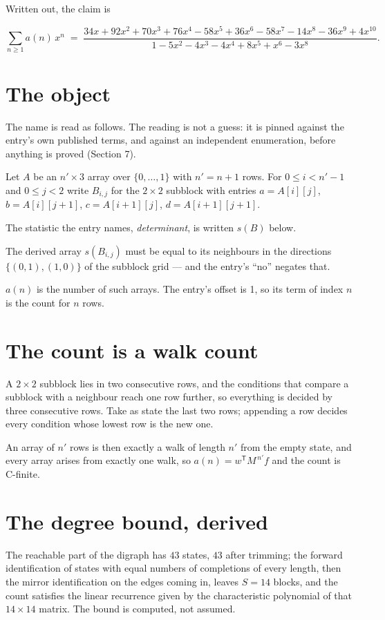 \documentclass[11pt]{article}
\theoremstyle{definition}
\begin{document}
Written out, the claim is

\[\sum_{n \ge 1} a(n)\,x^n \;=\; \frac{34x + 92x^{2} + 70x^{3} + 76x^{4} - 58x^{5} + 36x^{6} - 58x^{7} - 14x^{8} - 36x^{9} + 4x^{10}}{1 - 5x^{2} - 4x^{3} - 4x^{4} + 8x^{5} + x^{6} - 3x^{8}}.\]

\section{The object}

The name is read as follows. The reading is not a guess: it is pinned against the entry's own published terms, and against an independent enumeration, before anything is proved (Section 7).

Let $A$ be an $n' \times 3$ array over $\{0,\dots,1\}$ with $n' = n + 1$ rows. For $0 \le i < n'-1$ and $0 \le j < 2$ write $B_{i,j}$ for the $2\times2$ subblock with entries $a = A[i][j]$, $b = A[i][j{+}1]$, $c = A[i{+}1][j]$, $d = A[i{+}1][j{+}1]$.

The statistic the entry names, {\itshape determinant}, is written $s(B)$ below.

The derived array $s(B_{i,j})$ must be equal to its neighbours in the directions $\{(0,1), (1,0)\}$ of the subblock grid --- and the entry's ``no'' negates that.

$a(n)$ is the number of such arrays. The entry's offset is 1, so its term of index $n$ is the count for $n$ rows.

\section{The count is a walk count}

A $2\times2$ subblock lies in two consecutive rows, and the conditions that compare a subblock with a neighbour reach one row further, so everything is decided by three consecutive rows. Take as state the last two rows; appending a row decides every condition whose lowest row is the new one.

An array of $n'$ rows is then exactly a walk of length $n'$ from the empty state, and every array arises from exactly one walk, so $a(n) = w^{\mathsf T}M^{\,n'}f$ and the count is C-finite.

\section{The degree bound, derived}

The reachable part of the digraph has $43$ states, $43$ after trimming; the forward identification of states with equal numbers of completions of every length, then the mirror identification on the edges coming in, leaves $S = 14$ blocks, and the count satisfies the linear recurrence given by the characteristic polynomial of that $14\times14$ matrix. The bound is computed, not assumed.
\end{document}
